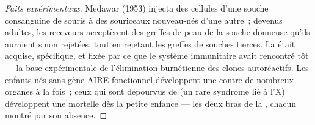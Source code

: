 \begin{proof}[Faits expérimentaux]
Medawar (1953) injecta des cellules d'une souche consanguine de souris à
des souriceaux nouveau-nés d'une autre~; devenus adultes, les receveurs
acceptèrent des greffes de peau de la souche donneuse qu'ils auraient
sinon rejetées, tout en rejetant les greffes de souches tierces. La
 était acquise, spécifique, et fixée par ce que le système
immunitaire avait rencontré tôt --- la base expérimentale de
l'élimination burnétienne des clones autoréactifs. Les enfants nés sans
gène AIRE fonctionnel développent une  contre de nombreux
organes à la fois~; ceux qui sont dépourvus de  (un rare syndrome
lié à l'X) développent une  mortelle dès la petite enfance
--- les deux bras de la , chacun montré par son absence.
\end{proof}

